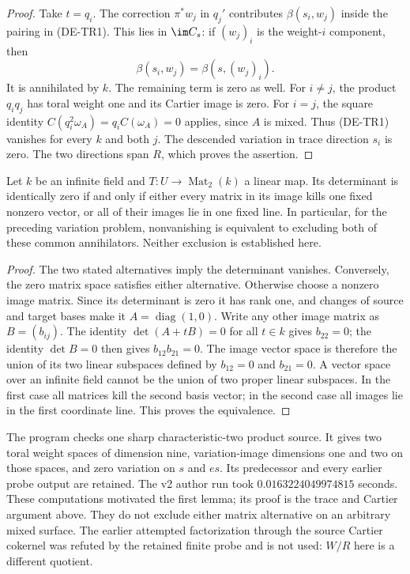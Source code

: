\begin{proof}
Take $t=q_i$. The correction $\pi^*w_j$ in $q_j'$ contributes
$\beta(s_i,w_j)$ inside the pairing in (DE-TR1). This lies in
$\im C_s$: if $(w_j)_i$ is the weight-$i$ component, then
\[
                \beta(s_i,w_j)=\beta(s,(w_j)_i).
\]
It is annihilated by $k$. The remaining term is zero as well.
For $i\ne j$, the product $q_iq_j$ has toral weight one and
its Cartier image is zero. For $i=j$, the square identity
$C(q_i^2\omega_A)=q_iC(\omega_A)=0$ applies, since $A$ is mixed.
Thus (DE-TR1) vanishes for every $k$ and both $j$.
The descended variation in trace direction $s_i$ is zero.
The two directions span $R$, which proves the assertion.
\end{proof}

\begin{lemma}
\label{lem:DE-A3-positive-matrix-ruling}
Let $k$ be an infinite field and $T:U\to\operatorname{Mat}_2(k)$
a linear map. Its determinant is identically zero if and only if
either every matrix in its image kills one fixed nonzero vector,
or all of their images lie in one fixed line.
In particular, for the preceding variation problem, nonvanishing
is equivalent to excluding both of these common annihilators.
Neither exclusion is established here.
\end{lemma}
\begin{proof}
The two stated alternatives imply the determinant vanishes.
Conversely, the zero matrix space satisfies either alternative.
Otherwise choose a nonzero image matrix. Since its determinant
is zero it has rank one, and changes of source and target bases
make it $A=\operatorname{diag}(1,0)$.
Write any other image matrix as $B=(b_{ij})$.
The identity $\det(A+tB)=0$ for all $t\in k$ gives $b_{22}=0$;
the identity $\det B=0$ then gives $b_{12}b_{21}=0$.
The image vector space is therefore the union of its two linear
subspaces defined by $b_{12}=0$ and $b_{21}=0$.
A vector space over an infinite field cannot be the union of
two proper linear subspaces. In the first case all matrices kill
the second basis vector; in the second case all images lie in
the first coordinate line. This proves the equivalence.
\end{proof}

\begin{remark}
\label{rem:DE-A3-positive-trace-probe-scope}
The program
checks one sharp characteristic-two product source. It gives
two toral weight spaces of dimension nine, variation-image
dimensions one and two on those spaces, and zero variation on
$s$ and $es$. Its predecessor and every earlier probe output are
retained. The v2 author run took $0.0163224049974815$ seconds.
These computations motivated the first lemma; its
proof is the trace and Cartier argument above. They do not
exclude either matrix alternative on an arbitrary mixed surface.
The earlier attempted factorization through the source Cartier
cokernel was refuted by the retained finite probe and is not
used: $W/R$ here is a different quotient.
\end{remark}


